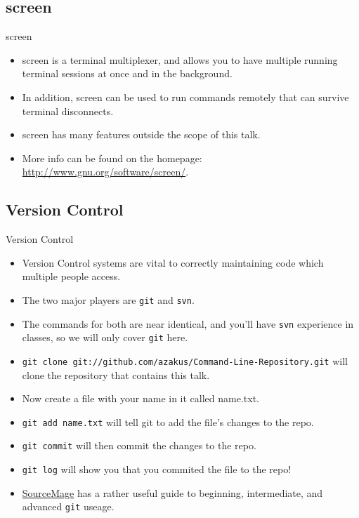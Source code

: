 \documentclass[10pt]{beamer}
\begin{document}
\subsection{screen}
\begin{frame}{screen}
\begin{itemize}
\item screen is a terminal multiplexer, and allows you to have multiple running terminal sessions at once and in the background.
\item In addition, screen can be used to run commands remotely that can survive terminal disconnects.
\item screen has many features outside the scope of this talk.
\item More info can be found on the homepage: \url{http://www.gnu.org/software/screen/}.
\end{itemize}
\end{frame}

\subsection{Version Control}
\begin{frame}{Version Control}
\begin{itemize}
\item Version Control systems are vital to correctly maintaining code which multiple people access.
\item The two major players are \texttt{\color{blue}git} and \texttt{\color{blue}svn}.
\item The commands for both are near identical, and you'll have \texttt{\color{blue}svn} experience in classes, so we will only cover \texttt{\color{blue}git} here.
\item \texttt{\color{blue}git clone git://github.com/azakus/Command-Line-Repository.git} will clone the repository that contains this talk.
\item Now create a file with your name in it called name.txt.
\item \texttt{\color{blue}git add name.txt} will tell git to add the file's changes to the repo.
\item \texttt{\color{blue}git commit} will then commit the changes to the repo.
\item \texttt{\color{blue}git log} will show you that you commited the file to the repo!
\item \href{http://www.sourcemage.org/Git\_Guide}{\color{blue}SourceMage} has a rather useful guide to beginning, intermediate, and advanced \texttt{git} useage.
\end{itemize}
\end{frame}
\end{document}
